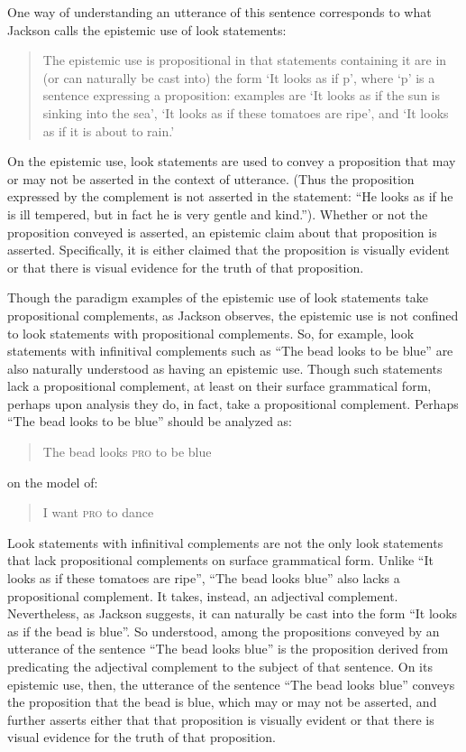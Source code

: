 \documentclass[12pt]{article}
\begin{document}
One way of understanding an utterance of this sentence corresponds to what Jackson calls the epistemic use of look statements:
	\begin{quote}
		The epistemic use is propositional in that statements containing it are in (or can naturally be cast into) the form `It looks as if p', where `p' is a sentence expressing a proposition: examples are `It looks as if the sun is sinking into the sea', `It looks as if these tomatoes are ripe', and `It looks as if it is about to rain.' \citep[30]{Jackson:1977fk}
	\end{quote}
On the epistemic use, look statements are used to convey a proposition that may or may not be asserted in the context of utterance. (Thus the proposition expressed by the complement is not asserted in the statement: ``He looks as if he is ill tempered, but in fact he is very gentle and kind.''). Whether or not the proposition conveyed is asserted, an epistemic claim about that proposition is asserted. Specifically, it is either claimed that the proposition is visually evident or that there is visual evidence for the truth of that proposition. 

Though the paradigm examples of the epistemic use of look statements take propositional complements, as Jackson observes, the epistemic use is not confined to look statements with propositional complements. So, for example, look statements with infinitival complements such as ``The bead looks to be blue'' are also naturally understood as having an epistemic use. Though such statements lack a propositional complement, at least on their surface grammatical form, perhaps upon analysis they do, in fact, take a propositional complement. Perhaps ``The bead looks to be blue'' should be analyzed as:
	\begin{quote}
		The bead looks \textsc{pro} to be blue
	\end{quote}
on the model of:
	\begin{quote}
		I want \textsc{pro} to dance
	\end{quote}

Look statements with infinitival complements are not the only look statements that lack propositional complements on surface grammatical form. Unlike ``It looks as if these tomatoes are ripe'', ``The bead looks blue'' also lacks a propositional complement. It takes, instead, an adjectival complement. Nevertheless, as Jackson suggests, it can naturally be cast into the form ``It looks as if the bead is blue''. So understood, among the propositions conveyed by an utterance of the sentence ``The bead looks blue'' is the proposition derived from predicating the adjectival complement to the subject of that sentence. On its epistemic use, then, the utterance of the sentence ``The bead looks blue'' conveys the proposition that the bead is blue, which may or may not be asserted, and further asserts either that that proposition is visually evident or that there is visual evidence for the truth of that proposition.
\end{document}
